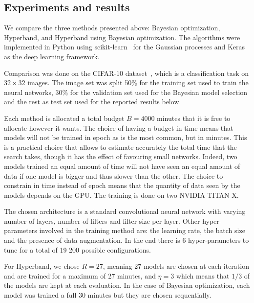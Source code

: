 \subsection{Experiments and results}

We compare the three methods presented above: Bayesian optimization, Hyperband, and Hyperband using Bayesian optimization. The algorithms were implemented in Python using scikit-learn~\textcite{pedregosa2011sklearn} for the Gaussian processes and Keras~\textcite{chollet2015keras} as the deep learning framework.

Comparison was done on the CIFAR-10 dataset~\textcite{krizhevsky2009}, which is a classification task on $32 \times 32$ images. The image set was split 50\% for the training set used to train the neural networks, 30\% for the validation set used for the Bayesian model selection and the rest as test set used for the reported results below. 

Each method is allocated a total budget $B = 4000$ minutes that it is free to allocate however it wants. The choice of having a budget in time means that models will not be trained in epoch as is the most common, but in minutes. This is a practical choice that allows to estimate accurately the total time that the search takes, though it has the effect of favouring small networks. Indeed, two models trained an equal amount of time will not have seen an equal amount of data if one model is bigger and thus slower than the other. The choice to constrain in time instead of epoch means that the quantity of data seen by the models depends on the GPU. The training is done on two NVIDIA TITAN X.

The chosen architecture is a standard convolutional neural network with varying number of layers, number of filters and filter size per layer. Other hyper-parameters involved in the training method are: the learning rate, the batch size and the presence of data augmentation. In the end there is 6 hyper-parameters to tune for a total of 19 200 possible configurations.

For Hyperband, we chose $R = 27$, meaning 27 models are chosen at each iteration and are trained for a maximum of 27 minutes, and $\eta = 3$ which means that $1/3$ of the models are kept at each evaluation. In the case of Bayesian optimization, each model was trained a full $30$ minutes but they are chosen sequentially.

